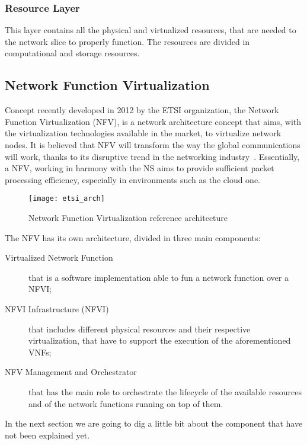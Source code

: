 \subsubsection{Resource Layer}
This layer contains all the physical and virtualized resources, that are needed
to the network slice to properly function. The resources are divided in
computational and storage resources.

\subsection{Network Function Virtualization}
Concept recently developed in 2012 by the ETSI organization, the Network
Function Virtualization (NFV), is a network architecture concept that aims, with
the virtualization technologies available in the market, to virtualize network
nodes. It is believed that NFV will transform the way the global communications
will work, thanks to its disruptive trend in the networking
industry~\cite{gray2016network}. Essentially, a NFV, working in harmony with the
NS aims to provide sufficient packet processing efficiency, especially in
environments such as the cloud one.

\begin{figure}[t]
  \centering
  \texttt{[image: etsi\_arch]}
  \caption[Network Function Virtualization reference architecture]{Network
    Function Virtualization reference architecture~\cite{etsi2013gs}}
  \label{chap:background:img:etsi_arch}
\end{figure}

\noindent The NFV has its own architecture, divided in three main components:
\begin{description}
\item[Virtualized Network Function] that is a software implementation able to fun
  a network function over a NFVI;
\item[NFVI Infrastructure (NFVI)] that includes different physical resources
  and their respective virtualization, that have to support the execution of the
  aforementioned VNFs;
\item[NFV Management and Orchestrator] that has the main role to orchestrate the
  lifecycle of the available resources and of the network functions running on
  top of them.
\end{description}

In the next section we are going to dig a little bit about the component that
have not been explained yet.

